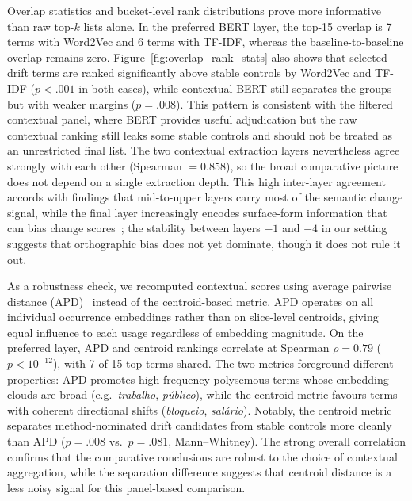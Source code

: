 \documentclass[12pt]{article}
\begin{document}
Overlap statistics and bucket-level rank distributions prove more informative
than raw top-$k$ lists alone. In the preferred BERT layer,
the top-15 overlap is 7 terms with Word2Vec and 6 terms with TF-IDF, whereas the
baseline-to-baseline overlap remains zero. Figure~\ref{fig:overlap_rank_stats} also
shows that selected drift terms are ranked significantly above stable controls by
Word2Vec and TF-IDF ($p < .001$ in both cases), while contextual BERT still
separates the groups but with weaker margins ($p = .008$). This pattern is
consistent with the filtered contextual panel, where BERT
provides useful adjudication but the raw contextual ranking still leaks some
stable controls and should not be treated as an unrestricted final list. The
two contextual extraction layers nevertheless agree strongly with each other
(Spearman $= 0.858$), so the broad comparative picture does not depend on a
single extraction depth. This high inter-layer agreement accords with findings
that mid-to-upper layers carry most of the semantic change signal, while the
final layer increasingly encodes surface-form information that can bias change
scores~\cite{laicher-etal-2021-explaining,cassotti-etal-2024-systematic}; the
stability between layers $-1$ and $-4$ in our setting suggests that
orthographic bias does not yet dominate, though it does not rule it out.

As a robustness check, we recomputed contextual scores using average pairwise
distance (APD)~\cite{giulianelli-etal-2020-analysing} instead of the centroid-based
metric. APD operates on all individual occurrence embeddings rather than on
slice-level centroids, giving equal influence to each usage regardless of
embedding magnitude. On the preferred layer, APD and centroid rankings
correlate at Spearman $\rho = 0.79$ ($p < 10^{-12}$), with 7 of 15 top terms
shared. The two metrics foreground different properties: APD promotes
high-frequency polysemous terms whose embedding clouds are broad (e.g.\
\textit{trabalho}, \textit{p\'ublico}), while the centroid metric favours
terms with coherent directional shifts (\textit{bloqueio},
\textit{sal\'ario}). Notably, the centroid metric separates method-nominated
drift candidates from stable controls more cleanly than APD ($p = .008$ vs.\
$p = .081$, Mann--Whitney). The strong overall correlation confirms that the
comparative conclusions are robust to the choice of contextual aggregation,
while the separation difference suggests that centroid distance is a less
noisy signal for this panel-based comparison.
\end{document}
